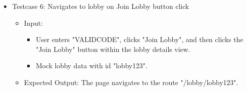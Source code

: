 \begin{itemize}
    \item Testcase 6: Navigates to lobby on Join Lobby button click
    \begin{itemize}
        \item Input:
            \begin{itemize}
                \item User enters "VALIDCODE", clicks "Join Lobby", and then clicks the "Join Lobby" button within the lobby details view.
                \item Mock lobby data with id "lobby123".
            \end{itemize}
        \item Expected Output: The page navigates to the route "/lobby/lobby123".
    \end{itemize}
\end{itemize}

